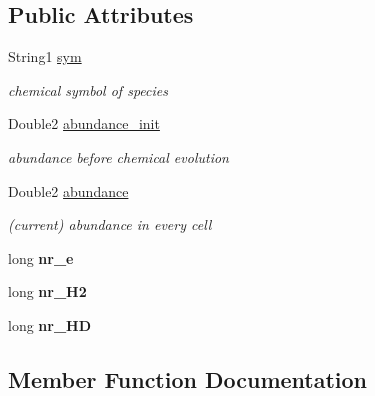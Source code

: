 \subsection*{Public Attributes}
\begin{DoxyCompactItemize}
\item 
\mbox{\label{structSpecies_ab1d965b850c92403ab8475ea2b0068bf}} 
String1 \mbox{\hyperlink{structSpecies_ab1d965b850c92403ab8475ea2b0068bf}{sym}}
\begin{DoxyCompactList}\small\item\em chemical symbol of species \end{DoxyCompactList}\item 
\mbox{\label{structSpecies_a3df04d380fd2f0a1f8464562c7ad05a0}} 
Double2 \mbox{\hyperlink{structSpecies_a3df04d380fd2f0a1f8464562c7ad05a0}{abundance\+\_\+init}}
\begin{DoxyCompactList}\small\item\em abundance before chemical evolution \end{DoxyCompactList}\item 
\mbox{\label{structSpecies_aa5af9ae841da2d671532d58cd0c84023}} 
Double2 \mbox{\hyperlink{structSpecies_aa5af9ae841da2d671532d58cd0c84023}{abundance}}
\begin{DoxyCompactList}\small\item\em (current) abundance in every cell \end{DoxyCompactList}\item 
\mbox{\label{structSpecies_aab1181ae5af5a0a4904a647f50325465}} 
long {\bfseries nr\+\_\+e}
\item 
\mbox{\label{structSpecies_a0464234d60c9a33fa91cb15e627e08d5}} 
long {\bfseries nr\+\_\+\+H2}
\item 
\mbox{\label{structSpecies_aa132e3fcdfda6783636d831c5275024b}} 
long {\bfseries nr\+\_\+\+HD}
\end{DoxyCompactItemize}


\subsection{Member Function Documentation}
\mbox{\label{structSpecies_a8816c98e9fdc90c4b8c8aba44859cc44}} 
